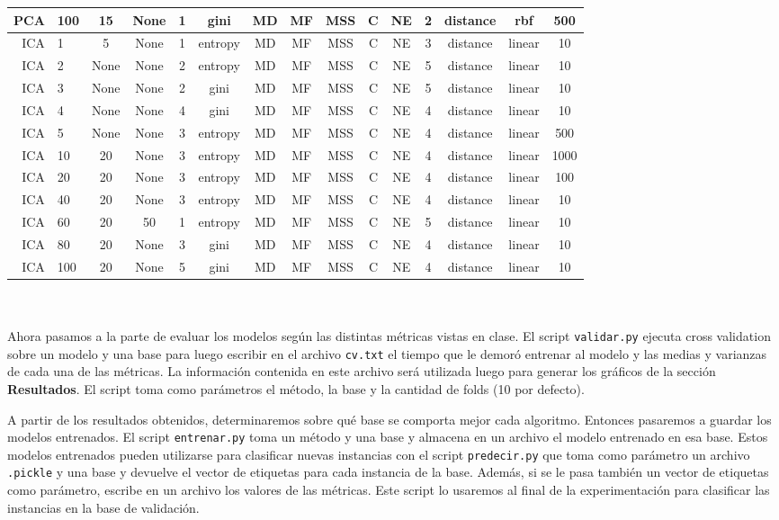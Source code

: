 \documentclass[10pt, a4paper]{article}
\begin{document}
\begin{scriptsize}
\begin{tabular}{|r|l||c|c|c|c||c|c|c|c|c||c|c||c|c|}
\hline
PCA & 100 & 15 & None & 1 & gini & MD & MF & MSS & C & NE & 2 & distance & rbf & 500 \\
\hline
ICA & 1 & 5 & None & 1 & entropy & MD & MF & MSS & C & NE & 3 & distance & linear & 10 \\
\hline
ICA & 2 & None & None & 2 & entropy & MD & MF & MSS & C & NE & 5 & distance & linear & 10 \\
\hline
ICA & 3 & None & None & 2 & gini & MD & MF & MSS & C & NE & 5 & distance & linear & 10 \\
\hline
ICA & 4 & None & None & 4 & gini & MD & MF & MSS & C & NE & 4 & distance & linear & 10 \\
\hline
ICA & 5 & None & None & 3 & entropy & MD & MF & MSS & C & NE & 4 & distance & linear & 500 \\
\hline
ICA & 10 & 20 & None & 3 & entropy & MD & MF & MSS & C & NE & 4 & distance & linear & 1000 \\
\hline
ICA & 20 & 20 & None & 3 & entropy & MD & MF & MSS & C & NE & 4 & distance & linear & 100 \\
\hline
ICA & 40 & 20 & None & 3 & entropy & MD & MF & MSS & C & NE & 4 & distance & linear & 10 \\
\hline
ICA & 60 & 20 & 50 & 1 & entropy & MD & MF & MSS & C & NE & 5 & distance & linear & 10 \\
\hline
ICA & 80 & 20 & None & 3 & gini & MD & MF & MSS & C & NE & 4 & distance & linear & 10 \\
\hline
ICA & 100 & 20 & None & 5 & gini & MD & MF & MSS & C & NE & 4 & distance & linear & 10 \\
\hline
\end{tabular}
\end{scriptsize}
\\\\
Ahora pasamos a la parte de evaluar los modelos según las distintas métricas vistas en clase. El script \texttt{validar.py} ejecuta cross validation sobre un modelo y una base para luego escribir en el archivo \texttt{cv.txt} el tiempo que le demoró entrenar al modelo y las medias y varianzas de cada una de las métricas. La información contenida en este archivo será utilizada luego para generar los gráficos de la sección \textbf{Resultados}. El script toma como parámetros el método, la base y la cantidad de folds (10 por defecto).

A partir de los resultados obtenidos, determinaremos sobre qué base se comporta mejor cada algoritmo. Entonces pasaremos a guardar los modelos entrenados. El script \texttt{entrenar.py} toma un método y una base y almacena en un archivo el modelo entrenado en esa base. Estos modelos entrenados pueden utilizarse para clasificar nuevas instancias con el script \texttt{predecir.py} que toma como parámetro un archivo \texttt{.pickle} y una base y devuelve el vector de etiquetas para cada instancia de la base. Además, si se le pasa también un vector de etiquetas como parámetro, escribe en un archivo los valores de las métricas. Este script lo usaremos al final de la experimentación para clasificar las instancias en la base de validación.
\end{document}
